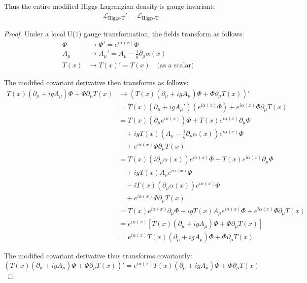 \documentclass{article}
\theoremstyle{definition}
\theoremstyle{remark}
\newcommand{\Tfield}{T(x)} %
\newcommand{\DhiggsTdef}{\Tfield (\partial_\mu + igA_\mu)\Phi + \Phi \partial_\mu \Tfield}
\begin{document}
	Thus the entire modified Higgs Lagrangian density is gauge invariant:
	\begin{align}
		&\mathcal{L}_{\text{Higgs-T}}' = \mathcal{L}_{\text{Higgs-T}}
	\end{align}
	\begin{proof}
		Under a local U(1) gauge transformation, the fields transform as follows:
		\begin{align}
			\Phi &\rightarrow \Phi' = e^{i\alpha(x)}\Phi \\
			A_\mu &\rightarrow A_\mu' = A_\mu - \frac{1}{g}\partial_\mu \alpha(x) \\
			\Tfield &\rightarrow \Tfield' = \Tfield \quad \text{(as a scalar)}
		\end{align}
		
		The modified covariant derivative then transforms as follows:
		\begin{align}
			\DhiggsTdef &\rightarrow (\DhiggsTdef)' \\
			&= \Tfield (\partial_\mu + igA_\mu')(e^{i\alpha(x)}\Phi) + e^{i\alpha(x)}\Phi \partial_\mu \Tfield \\
			&= \Tfield (\partial_\mu e^{i\alpha(x)})\Phi + \Tfield e^{i\alpha(x)}\partial_\mu\Phi \nonumber \\
			&\quad + ig\Tfield (A_\mu - \frac{1}{g}\partial_\mu \alpha(x))e^{i\alpha(x)}\Phi \nonumber \\
			&\quad + e^{i\alpha(x)}\Phi \partial_\mu \Tfield \\
			&= \Tfield (i\partial_\mu\alpha(x))e^{i\alpha(x)}\Phi + \Tfield e^{i\alpha(x)}\partial_\mu\Phi \nonumber \\
			&\quad + ig\Tfield A_\mu e^{i\alpha(x)}\Phi \nonumber \\
			&\quad - i\Tfield(\partial_\mu \alpha(x))e^{i\alpha(x)}\Phi \nonumber \\
			&\quad + e^{i\alpha(x)}\Phi \partial_\mu \Tfield \\
			&= \Tfield e^{i\alpha(x)}\partial_\mu\Phi + ig\Tfield A_\mu e^{i\alpha(x)}\Phi + e^{i\alpha(x)}\Phi \partial_\mu \Tfield \\
			&= e^{i\alpha(x)}[\Tfield(\partial_\mu + igA_\mu)\Phi + \Phi\partial_\mu\Tfield] \\
			&= e^{i\alpha(x)}\DhiggsTdef
		\end{align}
		
		The modified covariant derivative thus transforms covariantly:
		\begin{equation}
			(\DhiggsTdef)' = e^{i\alpha(x)}\DhiggsTdef
		\end{equation}
	\end{proof}
	
\end{document}
